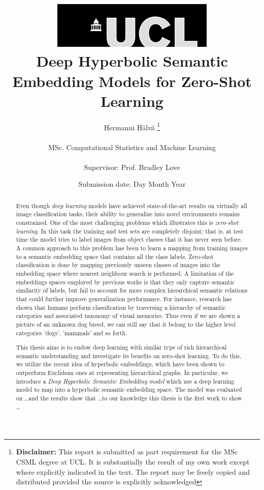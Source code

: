 \documentclass[12pt]{report}
\title{  	{ \includegraphics[scale=.5]{ucl_logo.png}}\\
{{\Huge Deep Hyperbolic Semantic Embedding Models for Zero-Shot Learning}}\\
		}
\date{Submission date: Day Month Year}
\author{Hermanni H{\"a}lv{\"a} \thanks{
{\bf Disclaimer:}
This report is submitted as part requirement for the MSc CSML degree at UCL. It is
substantially the result of my own work except where explicitly indicated in the text.
The report may be freely copied and distributed provided the source is explicitly acknowledged
\newline  %
}
\\ \\
MSc. Computational Statistics and Machine Learning\\ \\
Supervisor: Prof. Bradley Love}
\begin{document}
 
\onehalfspacing
\maketitle

\begin{abstract}
  Even though \textit{deep learning} models have achieved state-of-the-art results on virtually all image classification tasks, their ability to generalize into novel environments remains constrained. One of the most challenging problems which illustrates this is \textit{zero-shot learning}. In this task the training and test sets are completely disjoint; that is, at test time the model tries to label images from object classes that it has never seen before. A common approach to this problem has been to learn a mapping from training images to a semantic embedding space that contains all the class labels. Zero-shot classification is done by mapping previously unseen classes of images into the embedding space where nearest neighbour search is performed. A limitation of the embeddings spaces employed by previous works is that they only capture semantic similarity of labels, but fail to account for more complex hierarchical semantic relations that could further improve generalization performance. For instance, research has shown that humans perform classification by traversing a hierarchy of semantic categories and associated taxonomy of visual memories. Thus even if we are shown a picture of an unknown dog breed, we can still say that it belong to the higher level categories 'dogs', 'mammals' and so forth. 

This thesis aims is to endow deep learning with similar type of rich hierarchical semantic understanding and investigate its benefits on zero-shot learning. To do this, we utilize the recent idea of hyperbolic embeddings, which have been shown to outperform Euclidean ones at representing hierarchical graphs. In particular, we introduce a \textit{Deep Hyperbolic Semantic Embedding model} which use a deep learning model to map into a hyperbolic semantic embedding space. The model was evaluated on  \dots and the results show that \dots to our knowledge this thesis is the first work to show \dots

\end{abstract}
\end{document}

